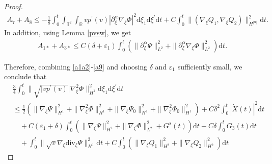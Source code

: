 \documentclass[10pt,reqno]{amsart}
\numberwithin{equation}{section}
\newcommand{\dif}{\mathrm{d}}
\newcommand{\ddiv}{\mathrm{div}}
\begin{document}
\begin{proof}
\begin{equation}
\begin{aligned}
A_7+A_8\le-\frac{1}{8}\int_0^t\int_{\mathbb{T}^2}\int_{\mathbb{R}}vp^\prime(v)|\partial_\xi^\alpha\nabla_\xi\Phi|^2
\dif \xi_1\dif \xi^{\prime}\dif t+C\int_0^t\|(\nabla_\xi Q_1, \nabla_\xi Q_2)\|_{H^{|\alpha|}}^2\dif t
.
\end{aligned}
\end{equation}
In addition, using Lemma \ref{pvsw}, we get
\begin{equation}\label{a9}
\begin{aligned}
A_{1\ast}+A_{3\ast}\le C(\delta+\varepsilon_1)\int_0^t\left(\|\partial_\xi^\alpha\Psi\|_{L^2}^2+\|\partial_\xi^\alpha\nabla_\xi\Phi\|_{L^2}^2\right)
\dif t.
\end{aligned}
\end{equation}

Therefore, combining \eqref{a1a2}-\eqref{a9} and choosing $\delta$ and $\varepsilon_1$ sufficiently small, we conclude that
\begin{equation}\label{gjhsgj3}
\begin{aligned}
&\frac{3}{4}\int_0^t\|\sqrt{|vp^\prime(v)}|\nabla_\xi^2\Phi\|_{H^1}^2
\dif \xi_1\dif \xi^{\prime}\dif t\\
&\le \frac{1}{2}\left(\|\nabla_\xi\Psi\|_{H^1}^2+\|\nabla_\xi^2\Phi\|_{H^1}^2
+\|\nabla_\xi\Psi_0\|_{H^1}^2+\|\nabla_\xi^2\Phi_0\|_{H^1}^2\right)
+C\delta^2\int_0^t|\dot X(t)|^2\dif t\\
&\quad
+C(\varepsilon_1+\delta)\int_0^t\left(\|\nabla_\xi\Psi\|_{H^2}^2+\|\nabla_\xi\Phi\|_{L^2}^2
+G^s(t)\right)\dif t
+C\delta\int_0^t
G_3(t)\dif t
\\
&\quad+\int_0^t\|
\sqrt{v}\nabla_\xi\ddiv_\xi\Psi\|_{H^1}^2
\dif t+C\int_0^t\left(\|\nabla_\xi Q_1\|_{H^2}^2+\|\nabla_\xi Q_2\|_{H^2}^2\right)
\dif t
\end{aligned}
\end{equation}


\end{proof}
\end{document}
